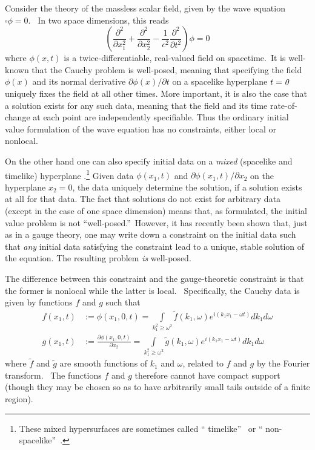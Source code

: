 \documentclass[12pt]{article}%
\begin{document}
Consider the theory of the massless scalar field, given by the wave equation
$\square\phi=0$. \ In two space dimensions, this reads%
\begin{equation}
\left(  \frac{\partial^{2}}{\partial x_{1}^{2}}+\frac{\partial^{2}}{\partial
x_{2}^{2}}-\frac{1}{c^{2}}\frac{\partial^{2}}{\partial t^{2}}\right)  \phi=0
\end{equation}
where $\phi(x,t)$ is a twice-differentiable, real-valued field on
spacetime.\ It is well-known that the Cauchy problem is well-posed, meaning
that specifying the field $\phi(x)$ and its normal derivative $\partial
\phi(x)/\partial t$ on a spacelike hyperplane $t=\emph{0}$ uniquely fixes the
field at all other times. More important, it is also the case that a solution
exists for any such data, meaning that the field and its time rate-of-change
at each point are independently specifiable. Thus the ordinary initial value
formulation of the wave equation has no constraints, either local or nonlocal.

On the other hand one can also specify initial data on a \emph{mixed}
(spacelike and timelike) hyperplane \cite{Joh91}.\footnote{These mixed
hypersurfaces are sometimes called \textquotedblleft
timelike\textquotedblright\ \cite{Joh91} or \textquotedblleft
non-spacelike\textquotedblright\ \cite{Cou62}.} Given data $\phi(x_{1},t)$ and
$\partial\phi(x_{1},t)/\partial x_{2}$ on the hyperplane $x_{2}=0$, the data
uniquely determine the solution, if a solution exists at all for that data.
The fact that solutions do not exist for arbitrary data (except in the case of
one space dimension) means that, as formulated, the initial value problem is
not \textquotedblleft well-posed.\textquotedblright\ However, it has recently
been shown \cite{CW08} that, just as in a gauge theory, one may write down a
constraint on the initial data such that \emph{any} initial data satisfying
the constraint lead to a unique, stable solution of the equation. The
resulting problem \emph{is} well-posed.

The difference between this constraint and the gauge-theoretic constraint is
that the former is nonlocal while the latter is local. \ Specifically, the
Cauchy data is given by functions $f$ and $g$ such that
\begin{align}
f(x_{1},t)  &  :=\phi(x_{1},0,t)=%
{\displaystyle\int\limits_{k_{1}^{2}\geq\omega^{2}}}
\tilde{f}(k_{1},\omega)e^{i(k_{1}x_{1}-\omega t)}dk_{1}d\omega\\
g(x_{1},t)  &  :=\frac{\partial\phi(x_{1},0,t)}{\partial x_{2}}=%
{\displaystyle\int\limits_{k_{1}^{2}\geq\omega^{2}}}
\tilde{g}(k_{1},\omega)e^{i(k_{1}x_{1}-\omega t)}dk_{1}d\omega\nonumber
\end{align}
where $\tilde{f}$ and $\tilde{g}$ are smooth functions of $k_{1}$ and $\omega
$, related to $f$ and $g$ by the Fourier transform. \ The functions $f $ and
$g$ therefore cannot have compact support (though they may be chosen so as to
have arbitrarily small tails outside of a finite region).
\end{document}
